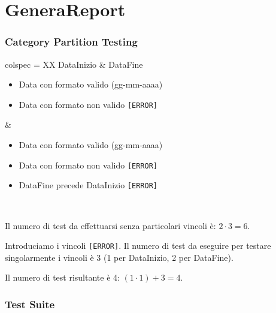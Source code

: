 \section{GeneraReport}

\subsubsection*{Category Partition Testing}

\begin{table}[H]
	\centering
	\footnotesize
	\begin{partest}{colspec = XX}
		DataInizio & DataFine\\
		\begin{itemize}[leftmargin=*]
			\item Data con formato valido (gg-mm-aaaa)
			\item Data con formato non valido \texttt{[ERROR]}
		\end{itemize} &
		\begin{itemize}[leftmargin=*]
			\item Data con formato valido (gg-mm-aaaa)
			\item Data con formato non valido \texttt{[ERROR]}
			\item DataFine precede DataInizio \texttt{[ERROR]}
		\end{itemize} \\
	\end{partest}
\end{table}

\noindent Il numero di test da effettuarsi senza particolari vincoli è: $2 \cdot 3 = 6$.

\noindent Introduciamo i vincoli \texttt{[ERROR]}. Il numero di test da eseguire per testare singolarmente i vincoli è 3 (1 per DataInizio, 2 per DataFine).

\noindent Il numero di test risultante è 4: $(1 \cdot 1) + 3 = 4$.

\subsubsection*{Test Suite}


